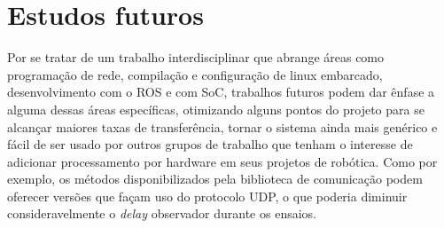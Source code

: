 \chapter{Estudos futuros}\label{cap:trabfut}

Por se tratar de um trabalho interdisciplinar que abrange áreas como programação de rede, compilação e configuração de linux embarcado, desenvolvimento com o ROS e com SoC, trabalhos futuros podem dar ênfase a alguma dessas áreas específicas, otimizando alguns pontos do projeto para se alcançar maiores taxas de transferência, tornar o sistema ainda mais genérico e fácil de ser usado por outros grupos de trabalho que tenham o interesse de adicionar processamento por hardware em seus projetos de robótica. Como por exemplo, os métodos disponibilizados pela biblioteca de comunicação podem oferecer versões que façam uso do protocolo UDP, o que poderia diminuir consideravelmente o \textit{delay} observador durante os ensaios. 

